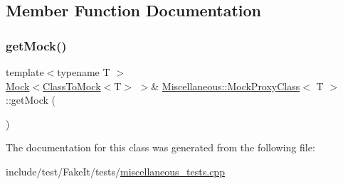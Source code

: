 \subsection{Member Function Documentation}
\mbox{\label{classMiscellaneous_1_1MockProxyClass_a8b704287e66d039c9dd566bf8d9cdf96}} 
\subsubsection{\texorpdfstring{getMock()}{getMock()}}
{\footnotesize\ttfamily template$<$typename T $>$ \\
\mbox{\hyperlink{classfakeit_1_1Mock}{Mock}}$<$\mbox{\hyperlink{classMiscellaneous_1_1ClassToMock}{Class\+To\+Mock}}$<$T$>$ $>$\& \mbox{\hyperlink{classMiscellaneous_1_1MockProxyClass}{Miscellaneous\+::\+Mock\+Proxy\+Class}}$<$ T $>$\+::get\+Mock (\begin{DoxyParamCaption}{ }\end{DoxyParamCaption})\hspace{0.3cm}{\ttfamily [inline]}}



The documentation for this class was generated from the following file\+:\begin{DoxyCompactItemize}
\item 
include/test/\+Fake\+It/tests/\mbox{\hyperlink{miscellaneous__tests_8cpp}{miscellaneous\+\_\+tests.\+cpp}}\end{DoxyCompactItemize}
